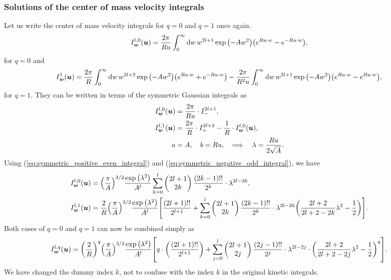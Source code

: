 \documentclass[aps,prl,preprint,groupedaddress,10pt]{revtex4-2}
\begin{document}
\subsubsection{Solutions of the center of mass velocity integrals}
Let us write the center of mass velocity integrals for $q=0$ and $q=1$ once again.
\begin{equation}
    I_{\bw}^{l,0}(\bu)=\frac{2\pi}{Ru}\int_0^{\infty}\dd{w}w^{2l+1}\exp\pqty{-Aw^2}
    \pqty{e^{Ru\cdot w}-e^{-Ru\cdot w}},
\end{equation}
for $q=0$ and
\begin{equation}
    I_{\bw}^{1}(\bu)=\frac{2\pi}{R}\int_0^{\infty}\dd{w}w^{2l+2}\exp\pqty{-Aw^2}
    \pqty{e^{Ru\cdot w}+e^{-Ru\cdot w}}
    -\frac{2\pi}{R^2u}\int_0^{\infty}\dd{w}w^{2l+1}\exp\pqty{-Aw^2}
    \pqty{e^{Ru\cdot w}-e^{Ru\cdot w}},
\end{equation}
for $q=1$. They can be written in terms of the symmetric Gaussian integrals as
\begin{equation}
    \begin{split}
        I_{\vb*{w}}^{l,0}(\vb*{u})&=\frac{2\pi}{Ru}\cdot I^{2l+1}_{-},\\
        I_{\vb*{w}}^{l,1}(\vb*{u})&=\frac{2\pi}{R}\cdot I^{2l+2}_{+}-\frac{1}{R}\cdot I_{\vb*{w}}^{l,0}(\vb*{u}),\\
        a&=A,\quad b=Ru,\quad\Longrightarrow\quad\lambda=\frac{Ru}{2\sqrt{A}}.
    \end{split}
\end{equation}
Using (\ref{eq:symmetric_positive_even_integral}) and (\ref{eq:symmetric_negative_odd_integral}), we have
\begin{equation}
    \begin{split}
        I_{\bw}^{l,0}(\bu)&=\pqty{\frac{\pi}{A}}^{3/2}\frac{\exp\pqty{\lambda^2}}{A^l}
        \sum_{k=0}^{l}\pmqty{2l+1\\2k}\frac{(2k-1)!!}{2^{k}}\cdot\lambda^{2l-2k},\\
        I_{\bw}^{l,1}(\bu)&=\frac{2}{R}\pqty{\frac{\pi}{A}}^{3/2}\frac{\exp\pqty{\lambda^2}}{A^l}
        \bqty{\frac{(2l+1)!!}{2^{l+1}}+\sum_{k=0}^{l}\pmqty{2l+1\\2k}\frac{(2k-1)!!}{2^k}
            \cdot\lambda^{2l-2k}\pqty{\frac{2l+2}{2l+2-2k}\lambda^2-\frac{1}{2}}}.
    \end{split}
\end{equation}
Both cases of $q=0$ and $q=1$ can now be combined simply as
\begin{equation}
    I_{\bw}^{l,q}(\bu)=\pqty{\frac{2}{R}}^q\pqty{\frac{\pi}{A}}^{3/2}\frac{\exp\pqty{\lambda^2}}{A^l}
    \bqty{q\cdot\pqty{\frac{(2l+1)!!}{2^{l+1}}}+\sum_{j=0}^{l}\pmqty{2l+1\\2j}\frac{(2j-1)!!}{2^j}
        \cdot\lambda^{2l-2j}\cdot\pqty{\frac{2l+2}{2l+2-2j}\lambda^2-\frac{1}{2}}^q}.
\end{equation}
We have changed the dummy index $k$, not to confuse with the index $k$ in the original kinetic integrals.
\end{document}
